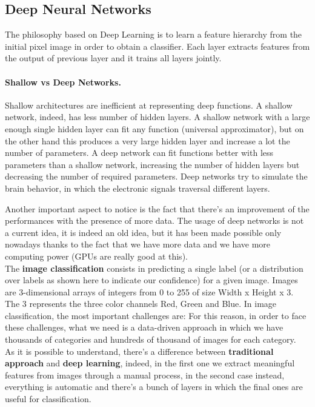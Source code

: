 \subsection{Deep Neural Networks}
The philosophy based on Deep Learning is to learn a feature hierarchy from the initial pixel image in order to obtain a classifier. Each layer extracts features from the output of previous layer and it trains all layers jointly.

\paragraph*{Shallow vs Deep Networks.} Shallow architectures are inefficient at representing deep functions. A shallow network, indeed, has less number of hidden layers. A shallow network with a large enough single hidden layer can fit any function (universal approximator), but on the other hand this produces a very large hidden layer and increase a lot the number of parameters. A deep network can fit functions better with less parameters than a shallow network, increasing the number of hidden layers but decreasing the number of required parameters. Deep networks try to simulate the brain behavior, in which the electronic signals traversal different layers.

Another important aspect to notice is the fact that there's an improvement of the performances with the presence of more data.
The usage of deep networks is not a current idea, it is indeed an old idea, but it has been made possible only nowadays thanks to the fact that we have more data and we have more computing power (GPUs are really good at this).\\
The \textbf{image classification} consists in predicting a single label (or a distribution over labels as shown here to indicate our confidence) for a given image. Images are 3-dimensional arrays of integers from 0 to 255 of size Width x Height x 3. The 3 represents the three color channels Red, Green and Blue.
In image classification, the most important challenges are:
For this reason, in order to face these challenges, what we need is a data-driven approach in which we have thousands of categories and hundreds of thousand of images for each category.\\
As it is possible to understand, there's a difference between \textbf{traditional approach} and \textbf{deep learning}, indeed, in the first one we extract meaningful features from images through a manual process, in the second case instead, everything is automatic and there's a bunch of layers in which the final ones are useful for classification.

